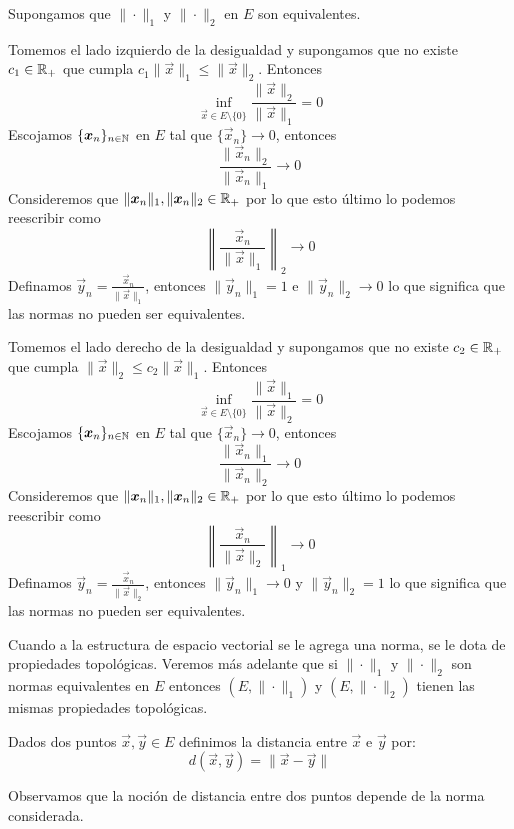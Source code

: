\begin{demostracion}
Supongamos que $\|\cdot\|_1$ y $\|\cdot\|_2$ en $E$ son equivalentes.

Tomemos el lado izquierdo de la desigualdad y supongamos que no existe $c_1 \in \mathbb{R}_+$ que cumpla $ c_1 \|\vec{x}\|_1 \leq \|\vec{x}\|_2$. Entonces
$$\inf_{\vec{x}\in E\setminus \{0\}} \frac{\|\vec{x}\|_2}{\|\vec{x}\|_1}=0$$
Escojamos $\{\boldsymbol{x}_n\}_{n\in \mathbb{N}}$ en $E$ tal que $\{\vec{x}_n\}\rightarrow 0$, entonces 
$$\frac{\|\vec{x}_n\|_2}{\|\vec{x}_n\|_1} \rightarrow 0$$
Consideremos que $\|\boldsymbol{x}_n\|_1 , \|\boldsymbol{x}_n\|_2 \in \mathbb{R}_+$ por lo que esto \'ultimo lo podemos reescribir como
$$\left\| \frac{\vec{x}_n}{\|\vec{x}\|_1} \right\|_2 \rightarrow 0$$
Definamos $\vec{y}_n = \frac{\vec{x}_n}{\|\vec{x}\|_1}$, entonces $\|\vec{y}_n\|_1 = 1$ e $\|\vec{y}_n\|_2 \rightarrow 0$ lo que significa que las normas no pueden ser equivalentes.

Tomemos el lado derecho de la desigualdad y supongamos que no existe $c_2 \in \mathbb{R}_+$ que cumpla $\|\vec{x}\|_2 \leq c_2 \|\vec{x}\|_1$. Entonces
$$\inf_{\vec{x}\in E\setminus \{0\}} \frac{\|\vec{x}\|_1}{\|\vec{x}\|_2}=0$$
Escojamos $\{\boldsymbol{x}_n\}_{n\in \mathbb{N}}$ en $E$ tal que $\{\vec{x}_n\}\rightarrow 0$, entonces 
$$\frac{\|\vec{x}_n\|_1}{\|\vec{x}_n\|_2} \rightarrow 0$$
Consideremos que $\|\boldsymbol{x}_n\|_1 , \|\boldsymbol{x}_n\|_2 \in \mathbb{R}_+$ por lo que esto \'ultimo lo podemos reescribir como
$$\left\| \frac{\vec{x}_n}{\|\vec{x}\|_2} \right\|_1 \rightarrow 0$$
Definamos $\vec{y}_n = \frac{\vec{x}_n}{\|\vec{x}\|_2}$, entonces $\|\vec{y}_n\|_1 \rightarrow 0$ y $\|\vec{y}_n\|_2 = 1$ lo que significa que las normas no pueden ser equivalentes.

\end{demostracion}

Cuando a la estructura de espacio vectorial se le agrega una norma, se le dota de propiedades topol\'ogicas. Veremos m\'as adelante que si $\|\cdot\|_1$ y $\|\cdot\|_2$ son normas equivalentes en $E$ entonces $(E,\|\cdot\|_1)$ y $(E,\|\cdot\|_2)$ tienen las mismas propiedades topol\'ogicas.

\begin{definicion}Dados dos puntos $\vec{x},\vec{y}\in E$ definimos la distancia entre $\vec{x}$ e $\vec{y}$ por:
$$d(\vec{x},\vec{y})=\|\vec{x}-\vec{y}\|$$
\end{definicion}

Observamos que la noci\'on de distancia entre dos puntos depende de la norma considerada.

